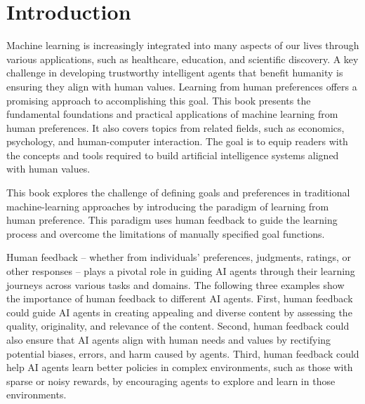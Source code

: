 \documentclass[
  letterpaper,
  numbers=noenddot,
  DIV=11,
  oneside]{scrreprt}
\let\oldchapter\chapter
\def\chapter{%
  \setcounter{sidenote}{1}%
  \oldchapter
}
\renewcommand*\contentsname{Table of contents}
\newcommand\contentsname{Table of contents}
\theoremstyle{remark}
\begin{document}
\restoregeometry{}


\renewcommand*\contentsname{Table of Contents}
{
\hypersetup{linkcolor=}
\setcounter{tocdepth}{1}
\tableofcontents
}


\chapter{Introduction}\label{ch-introduction}

Machine learning is increasingly integrated into many aspects of our
lives through various applications, such as healthcare, education, and
scientific discovery. A key challenge in developing trustworthy
intelligent agents that benefit humanity is ensuring they align with
human values. Learning from human preferences offers a promising
approach to accomplishing this goal. This book presents the fundamental
foundations and practical applications of machine learning from human
preferences. It also covers topics from related fields, such as
economics, psychology, and human-computer interaction. The goal is to
equip readers with the concepts and tools required to build artificial
intelligence systems aligned with human values.

This book explores the challenge of defining goals and preferences in
traditional machine-learning approaches by introducing the paradigm of
learning from human preference. This paradigm uses human feedback to
guide the learning process and overcome the limitations of manually
specified goal functions.

Human feedback -- whether from individuals' preferences, judgments,
ratings, or other responses -- plays a pivotal role in guiding AI agents
through their learning journeys across various tasks and domains. The
following three examples show the importance of human feedback to
different AI agents. First, human feedback could guide AI agents in
creating appealing and diverse content by assessing the quality,
originality, and relevance of the content. Second, human feedback could
also ensure that AI agents align with human needs and values by
rectifying potential biases, errors, and harm caused by agents. Third,
human feedback could help AI agents learn better policies in complex
environments, such as those with sparse or noisy rewards, by encouraging
agents to explore and learn in those environments.
\end{document}

